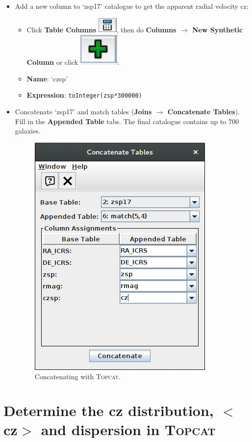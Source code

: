 \documentclass [a4paper, 12pt]{article}
\newcommand{\topcat}{{\textsc{Topcat}}}
\begin{document}
\begin{itemize}
\item Add a new column to `zsp17' catalogue to get the apparent radial velocity 
cz:
\begin{itemize}
    \item Click \textbf{Table Columns}  \includegraphics[width=0.04  
    \textwidth]{../images/topcat_button_metadata.jpg}, then do \textbf{Columns 
        $\rightarrow$ New Synthetic Column} or click  
        \includegraphics[width=0.04  
    \textwidth]{../images/topcat_button_add.jpg}.
    \item \textbf{Name}: `czsp'
    \item \textbf{Expression}: \texttt{toInteger(zsp*300000)}
\end{itemize}
\item Concatenate `zsp17' and match tables (\textbf{Joins $\rightarrow$ 
Concatenate Tables}). Fill in the \textbf{Appended Table} tabs. The final 
catalogue contains up to 700 galaxies.
\begin{figure}[H]
\center
\includegraphics[width=0.3  
\textwidth]{../images/topcat_concatenate_SDSS_Rines2003.png}
\caption{Concatenating with \topcat.}
\label{fig:topcatconcat}
\end{figure}
\end{itemize}

\section{Determine the cz distribution, $<$cz$>$ and dispersion in \topcat}
\end{document}
